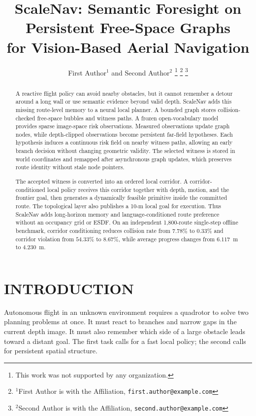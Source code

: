 \documentclass[letterpaper,10pt,conference]{ieeeconf}
\title{\LARGE \bf
ScaleNav: Semantic Foresight on Persistent Free-Space Graphs\\
for Vision-Based Aerial Navigation
}
\author{First Author$^{1}$ and Second Author$^{2}$%
\thanks{This work was not supported by any organization.}%
\thanks{$^{1}$First Author is with the Affiliation,
        {\tt\small first.author@example.com}}%
\thanks{$^{2}$Second Author is with the Affiliation,
        {\tt\small second.author@example.com}}%
}
\begin{document}
\maketitle
\thispagestyle{empty}
\pagestyle{empty}

\begin{abstract}
A reactive flight policy can avoid nearby obstacles, but it cannot remember a
detour around a long wall or use semantic evidence beyond valid depth.
ScaleNav adds this missing route-level memory to a neural local planner.  A
bounded graph stores collision-checked free-space bubbles and witness paths.
A frozen open-vocabulary model provides sparse image-space risk observations.
Measured observations update graph nodes, while depth-clipped observations
become persistent far-field hypotheses.  Each hypothesis induces a continuous
risk field on nearby witness paths, allowing an early branch decision without
changing geometric validity.  The selected witness is stored in world
coordinates and remapped after asynchronous graph updates, which preserves
route identity without stale node pointers.

The accepted witness is converted into an ordered local corridor.  A
corridor-conditioned local policy receives this corridor together with depth,
motion, and the frontier goal, then generates a dynamically feasible primitive
inside the committed route.  The topological layer also publishes a 10-m local
goal for execution.  Thus ScaleNav adds long-horizon memory and
language-conditioned route preference without an occupancy grid or ESDF.  On
an independent 1,800-route single-step offline benchmark, corridor conditioning
reduces collision rate from $7.78\%$ to $0.33\%$ and corridor violation from $54.33\%$ to
$8.67\%$, while average progress changes from $6.117$~m to $4.230$~m.
\end{abstract}

\section{INTRODUCTION}
Autonomous flight in an unknown environment requires a quadrotor to solve two
planning problems at once.  It must react to branches and narrow gaps in the
current depth image.  It must also remember which side of a large obstacle
leads toward a distant goal.  The first task calls for a fast local policy;
the second calls for persistent spatial structure.
\end{document}
